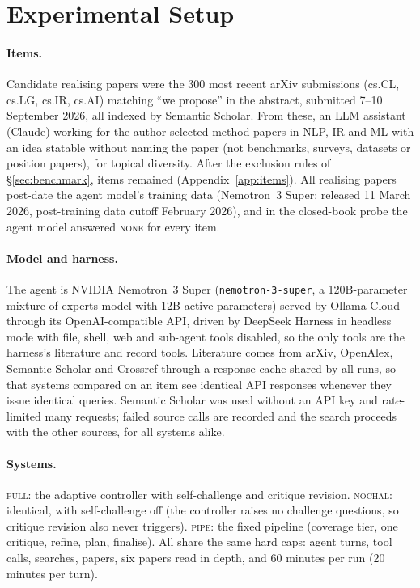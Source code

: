 \section{Experimental Setup}\label{sec:setup}

\paragraph{Items.} Candidate realising papers were the 300 most recent arXiv submissions (cs.CL, cs.LG, cs.IR, cs.AI) matching ``we propose'' in the abstract, submitted 7--10 September 2026, all indexed by Semantic Scholar. From these, an LLM assistant (Claude) working for the author selected \CandidatesChosen{} method papers in NLP, IR and ML with an idea statable without naming the paper (not benchmarks, surveys, datasets or position papers), for topical diversity. After the exclusion rules of \S\ref{sec:benchmark}, \PilotItems{} items remained (Appendix~\ref{app:items}). All realising papers post-date the agent model's training data (Nemotron~3 Super: released 11 March 2026, post-training data cutoff February 2026), and in the closed-book probe the agent model answered \textsc{none} for every item.

\paragraph{Model and harness.} The agent is NVIDIA Nemotron~3 Super (\texttt{nemotron-3-super}, a 120B-parameter mixture-of-experts model with 12B active parameters) served by Ollama Cloud through its OpenAI-compatible API, driven by DeepSeek Harness \texttt{\DshVersion} in headless mode with file, shell, web and sub-agent tools disabled, so the only tools are the harness's literature and record tools. Literature comes from arXiv, OpenAlex, Semantic Scholar and Crossref through a response cache shared by all runs, so that systems compared on an item see identical API responses whenever they issue identical queries. Semantic Scholar was used without an API key and rate-limited many requests; failed source calls are recorded and the search proceeds with the other sources, for all systems alike.

\paragraph{Systems.} \textsc{full}: the adaptive controller with self-challenge and critique revision. \textsc{nochal}: identical, with self-challenge off (the controller raises no challenge questions, so critique revision also never triggers). \textsc{pipe}: the fixed pipeline (coverage tier, one critique, refine, plan, finalise). All share the same hard caps: \MaxIterations{} agent turns, \MaxToolCalls{} tool calls, \MaxSearches{} searches, \MaxPapers{} papers, six papers read in depth, and 60 minutes per run (20 minutes per turn).

